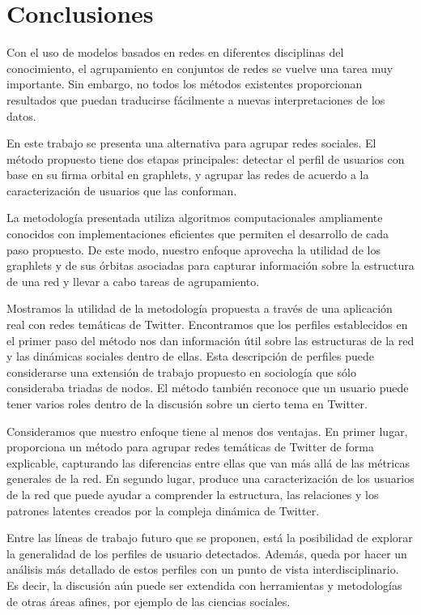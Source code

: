 
\chapter{Conclusiones}
\label{sec:conclusion}

Con el uso de modelos basados en redes en diferentes disciplinas del conocimiento, el agrupamiento en conjuntos de redes se vuelve una tarea muy importante. Sin embargo, no todos los métodos existentes proporcionan resultados que puedan traducirse fácilmente a nuevas interpretaciones de los datos. 

En este trabajo se presenta una alternativa para agrupar redes sociales. El método propuesto tiene dos etapas principales: detectar el perfil de usuarios con base en su firma orbital en graphlets, y agrupar las redes de acuerdo a la caracterización de usuarios que las conforman.  

La metodología presentada utiliza algoritmos computacionales ampliamente conocidos con implementaciones eficientes que permiten el desarrollo de cada paso propuesto. De este modo, nuestro enfoque aprovecha la utilidad de los graphlets y de sus órbitas asociadas para capturar información sobre la estructura de una red y llevar a cabo tareas de agrupamiento.

 
Mostramos la utilidad de la metodología propuesta a través de una aplicación real con redes temáticas de Twitter. Encontramos que los perfiles establecidos en el primer paso del método nos dan información útil sobre las estructuras de la red y las dinámicas sociales dentro de ellas. Esta descripción de perfiles puede considerarse una extensión de trabajo propuesto en sociología que sólo consideraba triadas de nodos. El método también reconoce que un usuario puede tener varios roles dentro de la discusión sobre un cierto tema en Twitter. 

Consideramos que nuestro enfoque tiene al menos dos ventajas. En primer lugar, proporciona un método para agrupar redes temáticas de Twitter de forma explicable, capturando las diferencias entre ellas que van más allá de las métricas generales de la red. En segundo lugar, produce una caracterización de los usuarios de la red que puede ayudar a comprender la estructura, las relaciones y los patrones latentes creados por la compleja dinámica de Twitter. 

Entre las líneas de trabajo futuro que se proponen, está la posibilidad de explorar la generalidad de los perfiles de usuario detectados. Además, queda por hacer un análisis más detallado de estos perfiles con un punto de vista interdisciplinario. Es decir, la discusión aún puede ser extendida con herramientas y metodologías de otras áreas afines, por ejemplo de las ciencias sociales.